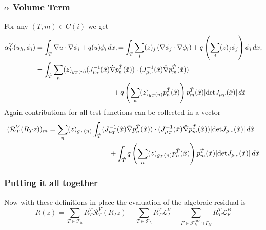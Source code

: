 \documentclass[a4paper,12pt]{article}
\begin{document}
\subsubsection*{$\alpha$ Volume Term}

For any $(T,m)\in C(i)$ we get
\begin{equation*}
\begin{split}
\alpha_T^V(u_h,\phi_i) &= \int_T \nabla u \cdot \nabla \phi_i + q(u) \phi_i \,dx,
= \int_T \sum_j (z)_j \left(\nabla \phi_j \cdot \nabla \phi_i \right) 
+ q\left( \sum_j (z)_j \phi_j \right) \phi_i \,dx,\\
&= \int_{\hat T} \sum_{n} (z)_{g_T(n)} (J_{\mu_T}^{-1}(\hat x) \hat\nabla p_n^{\hat T}(\hat x) )
\cdot (J_{\mu_T}^{-1}(\hat x) \hat\nabla p_m^{\hat T}(\hat x) ) \\
&\hspace{40mm}+ q\left( \sum_n (z)_{g_T(n)} p_n^{\hat T}(\hat x) \right) p_m^{\hat T}(\hat x) 
|\text{det} J_{\mu_T}(\hat x)| \,d\hat x
\end{split}
\end{equation*}
Again contributions for all test functions can be collected in a vector
\begin{equation*}
\begin{split}
(\mathcal{R}_T^V(R_T z))_m &=
\sum_{n} (z)_{g_T(n)} \int_{\hat T} (J_{\mu_T}^{-1}(\hat x) \hat\nabla p_n^{\hat T}(\hat x) )
\cdot (J_{\mu_T}^{-1}(\hat x) \hat\nabla p_m^{\hat T}(\hat x) ) |\text{det} J_{\mu_T}(\hat x)| \,d\hat x\\
&\hspace{30mm}+ \int_{\hat T} q\left( \sum_n (z)_{g_T(n)} p_n^{\hat T}(\hat x) \right) p_m^{\hat T}(\hat x) 
|\text{det} J_{\mu_T}(\hat x)| \,d\hat x
\end{split}
\end{equation*}


\subsubsection*{Putting it all together}

Now with these definitions in place the evaluation of the algebraic residual is
\begin{equation}
R(z) = 
\sum_{T\in\mathcal{T}_h} R_T^T \mathcal{R}_T^V(R_T z)
  + \sum_{T\in\mathcal{T}_h} R_T^T \mathcal{L}_T^V
 + \sum_{F\in\mathcal{F}_h^{\partial\Omega}\cap\Gamma_N} R_T^T \mathcal{L}_F^B
\label{eq:FinalResidualEvaluation}
\end{equation}
\end{document}
